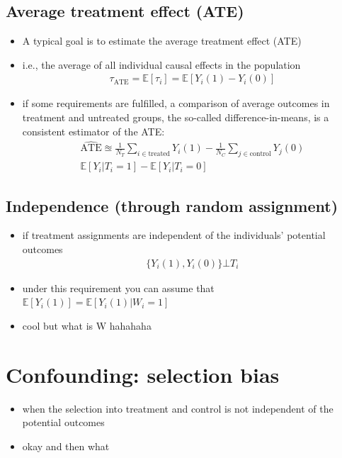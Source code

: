 \documentclass[10pt]{article}
\begin{document}
\subsection{Average treatment effect (ATE)}
\begin{itemize}
    \item A typical goal is to estimate the average treatment effect (ATE)
    \item i.e., the average of all individual causal effects in the population
    \begin{gather*}
        \tau_{\text{ATE}} = \mathbb{E}[\tau_i] = \mathbb{E}[Y_i(1) - Y_i(0)]
    \end{gather*}
    \item if some requirements are fulfilled, a comparison of average outcomes in treatment and untreated groups, the so-called difference-in-means, is a consistent estimator of the ATE: 
    \begin{gather*}
        \widehat{\text{ATE}} \approxeq \frac{1}{N_T}\sum_{i\in \text{treated}}Y_i(1) - \frac{1}{N_C}\sum_{j\in \text{control}}Y_j(0)\\
        \mathbb{E}[Y_i | T_i = 1] - \mathbb{E}[Y_i | T_i = 0]
    \end{gather*}
\end{itemize}
\subsection{Independence (through random assignment)}
\begin{itemize}
    \item if treatment assignments are independent of the individuals' potential outcomes
    \begin{gather*}
        \{Y_i(1), Y_i(0)\}\bot T_i
    \end{gather*}
    \item under this requirement you can assume that $\mathbb{E}[Y_i(1)] = \mathbb{E}[Y_i(1) | W_i = 1]$
    \item cool but what is W hahahaha
\end{itemize}
\newpage 
\section{Confounding: selection bias}
\begin{itemize}
    \item when the selection into treatment and control is not independent of the potential outcomes 
    \item okay and then what 
\end{itemize}
\end{document}
